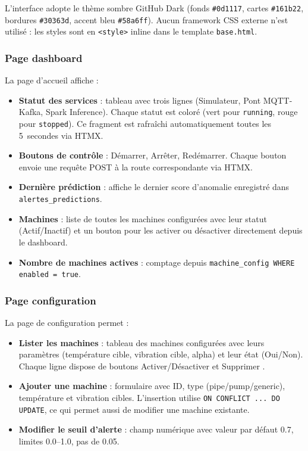 \documentclass[12pt,a4paper]{article}
\begin{document}
L'interface adopte le thème sombre \og GitHub Dark \fg{} (fonds \texttt{\#0d1117}, cartes \texttt{\#161b22}, bordures \texttt{\#30363d}, accent bleu \texttt{\#58a6ff}). Aucun framework CSS externe n'est utilisé : les styles sont en \texttt{<style>} inline dans le template \texttt{base.html}.

\subsubsection{Page dashboard}

La page d'accueil affiche :

\begin{itemize}
    \item \textbf{Statut des services} : tableau avec trois lignes (Simulateur, Pont MQTT-Kafka, Spark Inference). Chaque statut est coloré (vert pour \texttt{running}, rouge pour \texttt{stopped}). Ce fragment est rafraîchi automatiquement toutes les 5~secondes via HTMX.
    \item \textbf{Boutons de contrôle} : Démarrer, Arrêter, Redémarrer. Chaque bouton envoie une requête POST à la route correspondante via HTMX.
    \item \textbf{Dernière prédiction} : affiche le dernier score d'anomalie enregistré dans \texttt{alertes\_predictions}.
    \item \textbf{Machines} : liste de toutes les machines configurées avec leur statut (Actif/Inactif) et un bouton pour les activer ou désactiver directement depuis le dashboard.
    \item \textbf{Nombre de machines actives} : comptage depuis \texttt{machine\_config WHERE enabled = true}.
\end{itemize}

\subsubsection{Page configuration}

La page de configuration permet :

\begin{itemize}
    \item \textbf{Lister les machines} : tableau des machines configurées avec leurs paramètres (température cible, vibration cible, alpha) et leur état (Oui/Non). Chaque ligne dispose de boutons \og Activer/Désactiver \fg{} et \og Supprimer \fg{}.
    \item \textbf{Ajouter une machine} : formulaire avec ID, type (pipe/pump/generic), température et vibration cibles. L'insertion utilise \texttt{ON CONFLICT ... DO UPDATE}, ce qui permet aussi de modifier une machine existante.
    \item \textbf{Modifier le seuil d'alerte} : champ numérique avec valeur par défaut 0.7, limites 0.0--1.0, pas de 0.05.
\end{itemize}
\end{document}
